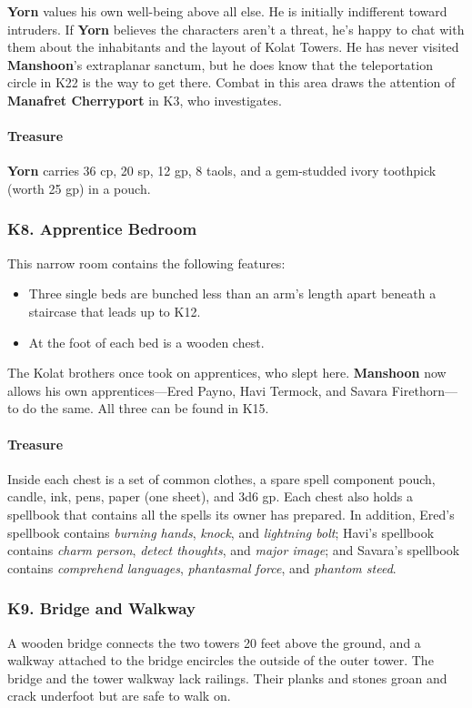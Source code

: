\documentclass[10pt,a4paper,twoside,twocolumn,openany,nodeprecatedcode]{dndbook}
\begin{document}
\textbf{Yorn} values his own well-being above all else. He is initially indifferent toward intruders. If \textbf{Yorn} believes the characters aren't a threat, he's happy to chat with them about the inhabitants and the layout of Kolat Towers. He has never visited \textbf{Manshoon}'s extraplanar sanctum, but he does know that the teleportation circle in K22 is the way to get there.
Combat in this area draws the attention of \textbf{Manafret Cherryport} in K3, who investigates.
\paragraph{Treasure}
\textbf{Yorn} carries 36 cp, 20 sp, 12 gp, 8 taols, and a gem-studded ivory toothpick (worth 25 gp) in a pouch.
\subsubsection{K8. Apprentice Bedroom}
This narrow room contains the following features:
\begin{itemize}

\item Three single beds are bunched less than an arm's length apart beneath a staircase that leads up to K12.
\item At the foot of each bed is a wooden chest.
\end{itemize}


The Kolat brothers once took on apprentices, who slept here. \textbf{Manshoon} now allows his own apprentices—Ered Payno, Havi Termock, and Savara Firethorn—to do the same. All three can be found in K15.
\paragraph{Treasure}
Inside each chest is a set of common clothes, a spare spell component pouch, candle, ink, pens, paper (one sheet), and 3d6 gp. Each chest also holds a spellbook that contains all the spells its owner has prepared. In addition, Ered's spellbook contains \textit{burning hands}, \textit{knock}, and \textit{lightning bolt}; Havi's spellbook contains \textit{charm person}, \textit{detect thoughts}, and \textit{major image}; and Savara's spellbook contains \textit{comprehend languages}, \textit{phantasmal force}, and \textit{phantom steed}.
\subsubsection{K9. Bridge and Walkway}
A wooden bridge connects the two towers 20 feet above the ground, and a walkway attached to the bridge encircles the outside of the outer tower. The bridge and the tower walkway lack railings. Their planks and stones groan and crack underfoot but are safe to walk on.
\end{document}
